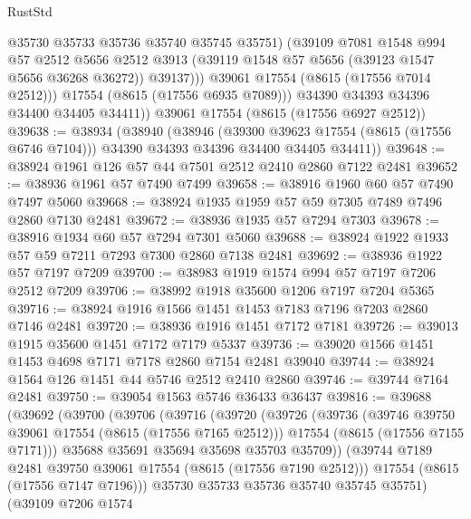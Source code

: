 \begin{lexlean}{RustStd}
\begin{coremodule}
                  @35730
                  @35733
                  @35736
                  @35740
                  @35745
                  @35751)
                (@39109
                  @7081
                  @1548
                  @994
                  @57
                  @2512
                  @5656
                  @2512
                  @3913
                  (@39119 @1548 @57 @5656 (@39123 @1547 @5656 @36268 @36272))
                  @39137)))
            @39061
            @17554
            (@8615 (@17556 @7014 @2512)))
          @17554
          (@8615 (@17556 @6935 @7089)))
        @34390
        @34393
        @34396
        @34400
        @34405
        @34411))
    @39061
    @17554
    (@8615 (@17556 @6927 @2512))
@39638 := @38934
    (@38940
      (@38946
        (@39300 @39623 @17554 (@8615 (@17556 @6746 @7104)))
        @34390
        @34393
        @34396
        @34400
        @34405
        @34411))
@39648 := @38924 @1961 @126 @57 @44 @7501 @2512 @2410 @2860 @7122 @2481
@39652 := @38936 @1961 @57 @7490 @7499
@39658 := @38916 @1960 @60 @57 @7490 @7497 @5060
@39668 := @38924 @1935 @1959 @57 @59 @7305 @7489 @7496 @2860 @7130 @2481
@39672 := @38936 @1935 @57 @7294 @7303
@39678 := @38916 @1934 @60 @57 @7294 @7301 @5060
@39688 := @38924 @1922 @1933 @57 @59 @7211 @7293 @7300 @2860 @7138 @2481
@39692 := @38936 @1922 @57 @7197 @7209
@39700 := @38983 @1919 @1574 @994 @57 @7197 @7206 @2512 @7209
@39706 := @38992 @1918 @35600 @1206 @7197 @7204 @5365
@39716 := @38924 @1916 @1566 @1451 @1453 @7183 @7196 @7203 @2860 @7146 @2481
@39720 := @38936 @1916 @1451 @7172 @7181
@39726 := @39013 @1915 @35600 @1451 @7172 @7179 @5337
@39736 := @39020 @1566 @1451 @1453 @4698 @7171 @7178 @2860 @7154 @2481 @39040
@39744 := @38924 @1564 @126 @1451 @44 @5746 @2512 @2410 @2860
@39746 := @39744 @7164 @2481
@39750 := @39054 @1563 @5746 @36433 @36437
@39816 := @39688
    (@39692
      (@39700
        (@39706
          (@39716
            (@39720
              (@39726
                (@39736
                  (@39746 @39750 @39061 @17554 (@8615 (@17556 @7165 @2512)))
                  @17554
                  (@8615 (@17556 @7155 @7171)))
                @35688
                @35691
                @35694
                @35698
                @35703
                @35709))
            (@39744 @7189 @2481 @39750 @39061 @17554 (@8615 (@17556 @7190 @2512)))
            @17554
            (@8615 (@17556 @7147 @7196)))
          @35730
          @35733
          @35736
          @35740
          @35745
          @35751)
        (@39109
          @7206
          @1574

\end{coremodule}
\end{lexlean}
